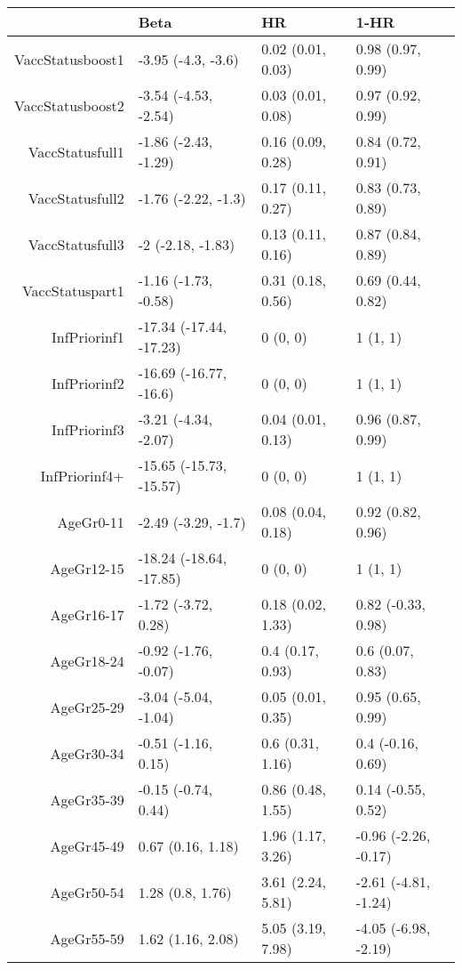 \begin{table}[ht]
\centering
\begin{tabular}{rlll}
  \hline
 & Beta & HR & 1-HR \\ 
  \hline
VaccStatusboost1 & -3.95 (-4.3, -3.6) & 0.02 (0.01, 0.03) & 0.98 (0.97, 0.99) \\ 
  VaccStatusboost2 & -3.54 (-4.53, -2.54) & 0.03 (0.01, 0.08) & 0.97 (0.92, 0.99) \\ 
  VaccStatusfull1 & -1.86 (-2.43, -1.29) & 0.16 (0.09, 0.28) & 0.84 (0.72, 0.91) \\ 
  VaccStatusfull2 & -1.76 (-2.22, -1.3) & 0.17 (0.11, 0.27) & 0.83 (0.73, 0.89) \\ 
  VaccStatusfull3 & -2 (-2.18, -1.83) & 0.13 (0.11, 0.16) & 0.87 (0.84, 0.89) \\ 
  VaccStatuspart1 & -1.16 (-1.73, -0.58) & 0.31 (0.18, 0.56) & 0.69 (0.44, 0.82) \\ 
  InfPriorinf1 & -17.34 (-17.44, -17.23) & 0 (0, 0) & 1 (1, 1) \\ 
  InfPriorinf2 & -16.69 (-16.77, -16.6) & 0 (0, 0) & 1 (1, 1) \\ 
  InfPriorinf3 & -3.21 (-4.34, -2.07) & 0.04 (0.01, 0.13) & 0.96 (0.87, 0.99) \\ 
  InfPriorinf4+ & -15.65 (-15.73, -15.57) & 0 (0, 0) & 1 (1, 1) \\ 
  AgeGr0-11 & -2.49 (-3.29, -1.7) & 0.08 (0.04, 0.18) & 0.92 (0.82, 0.96) \\ 
  AgeGr12-15 & -18.24 (-18.64, -17.85) & 0 (0, 0) & 1 (1, 1) \\ 
  AgeGr16-17 & -1.72 (-3.72, 0.28) & 0.18 (0.02, 1.33) & 0.82 (-0.33, 0.98) \\ 
  AgeGr18-24 & -0.92 (-1.76, -0.07) & 0.4 (0.17, 0.93) & 0.6 (0.07, 0.83) \\ 
  AgeGr25-29 & -3.04 (-5.04, -1.04) & 0.05 (0.01, 0.35) & 0.95 (0.65, 0.99) \\ 
  AgeGr30-34 & -0.51 (-1.16, 0.15) & 0.6 (0.31, 1.16) & 0.4 (-0.16, 0.69) \\ 
  AgeGr35-39 & -0.15 (-0.74, 0.44) & 0.86 (0.48, 1.55) & 0.14 (-0.55, 0.52) \\ 
  AgeGr45-49 & 0.67 (0.16, 1.18) & 1.96 (1.17, 3.26) & -0.96 (-2.26, -0.17) \\ 
  AgeGr50-54 & 1.28 (0.8, 1.76) & 3.61 (2.24, 5.81) & -2.61 (-4.81, -1.24) \\ 
  AgeGr55-59 & 1.62 (1.16, 2.08) & 5.05 (3.19, 7.98) & -4.05 (-6.98, -2.19) \\ 

\end{tabular}
\end{table}
